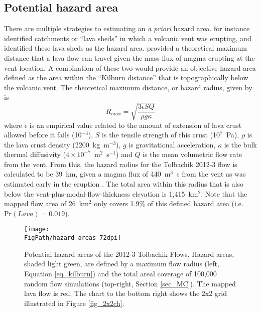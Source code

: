 	\subsection{Potential hazard area} There are multiple strategies to estimating an \textit{a priori} hazard area. \citet{kauahikaua1995applications} for instance identified catchments or ``lava sheds'' in which a volcanic vent was erupting, and identified these lava sheds as the hazard area. \citet{kilburn2000lava} provided a theoretical maximum distance that a lava flow can travel given the mass flux of magma erupting at the vent location. A combination of these two would provide an objective hazard area defined as the area within the ``Kilburn distance'' that is topographically below the volcanic vent. The theoretical maximum distance, or hazard radius, given by \citet{kilburn2000lava} is
		\begin{equation}
		R_{max}=\sqrt{\frac{3\epsilon SQ}{\rho g\kappa}}
		\label{eq_kilburn}
		\end{equation}
	where $\epsilon$ is an empirical value related to the amount of extension of lava crust allowed before it fails (10$^{-3}$), $S$ is the tensile strength of this crust (10$^7$~Pa), $\rho$ is the lava crust density (2200~kg~m$^{-3}$), $g$ is gravitational acceleration, $\kappa$ is the bulk thermal diffusivity ($4\times 10^{-7}$~m$^{2}$~s$^{-1}$) and $Q$ is the mean volumetric flow rate from the vent. From this, the hazard radius for the Tolbachik 2012-3 flow is calculated to be 39~km, given a magma flux of 440~m$^3$~s from the vent as was estimated early in the eruption \citep{belousov2015overview}. The total area within this radius that is also below the vent-plus-modal-flow-thickness elevation is 1,415~km$^2$. Note that the mapped flow area of 26~km$^2$ only covers 1.9\% of this defined hazard area (i.e. $\text{Pr}(Lava) = 0.019$).
	
		\begin{figure}
			\centering
			\texttt{[image: \\FigPath/hazard\_areas\_72dpi]}
			\caption[Potential hazard areas of the 2012-3 Tolbachik Flows]{Potential hazard areas of the 2012-3 Tolbachik Flows. Hazard areas, shaded light green, are defined by a maximum flow radius (left, Equation \ref{eq_kilburn}) and the total areal coverage of 100,000 random flow simulations (top-right, Section \ref{sec_MC}). The mapped lava flow is red. The chart to the bottom right shows the 2x2 grid illustrated in Figure \ref{fig_2x2ch}.}
			\label{fig_hazardarea}
		\end{figure}
	
